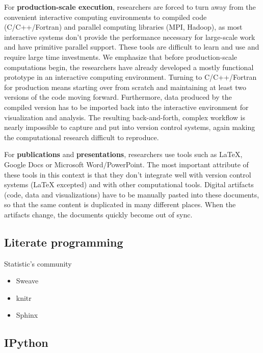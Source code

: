 \documentclass[ChapterTOCs,krantz2]{krantz} %
\begin{document}
For \textbf{production-scale execution}, researchers are forced to
turn away from the convenient interactive computing environments to
compiled code (C/C++/Fortran) and parallel computing libraries (MPI,
Hadoop), as most interactive systems don't provide the performance
necessary for large-scale work and have primitive parallel support.
These tools are difficult to learn and use and require large time
investments. We emphasize that before production-scale computations
begin, the researchers have already developed a mostly functional
prototype in an interactive computing environment. Turning to C/C++/Fortran
for production means starting over from scratch and maintaining at
least two versions of the code moving forward. Furthermore, data produced
by the compiled version has to be imported back into the interactive
environment for visualization and analysis. The resulting back-and-forth,
complex workflow is nearly impossible to capture and put into version
control systems, again making the computational research difficult
to reproduce.

For \textbf{publications} and\textbf{ presentations}, researchers
use tools such as \LaTeX{}, Google Docs or Microsoft Word/PowerPoint.
The most important attribute of these tools in this context is that
they don't integrate well with version control systems (\LaTeX{} excepted)
and with other computational tools. Digital artifacts (code, data
and visualizations) have to be manually pasted into these documents,
so that the same content is duplicated in many different places. When
the artifacts change, the documents quickly become out of sync. 


\subsection{Literate programming}

Statistic's community
\begin{itemize}
\item Sweave
\item knitr
\item Sphinx
\end{itemize}

\subsection{IPython}
\end{document}
